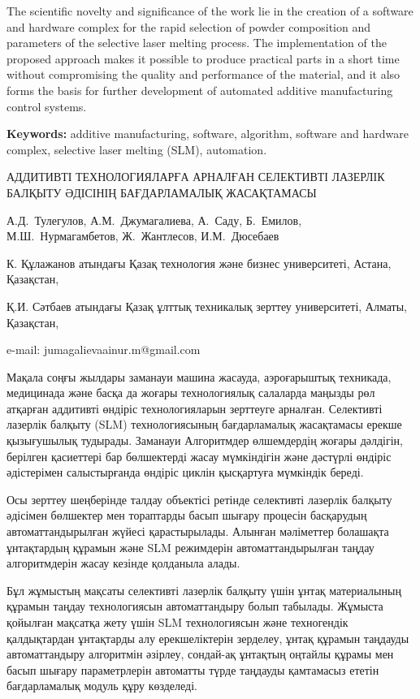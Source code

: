 The scientific novelty and significance of the work lie in the creation
of a software and hardware complex for the rapid selection of powder
composition and parameters of the selective laser melting process. The
implementation of the proposed approach makes it possible to produce
practical parts in a short time without compromising the quality and
performance of the material, and it also forms the basis for further
development of automated additive manufacturing control systems.

{\bfseries Keywords:} additive manufacturing, software, algorithm, software
and hardware complex, selective laser melting (SLM), automation.

\begin{header}
АДДИТИВТІ ТЕХНОЛОГИЯЛАРҒА АРНАЛҒАН СЕЛЕКТИВТІ ЛАЗЕРЛІК БАЛҚЫТУ ӘДІСІНІҢ БАҒДАРЛАМАЛЫҚ ЖАСАҚТАМАСЫ

А.Д.~Тулегулов,
А.М.~Джумагалиева\envelope,
А.~Саду,
Б.~Емилов,
М.Ш.~Нурмагамбетов,
Ж.~Жантлесов,
И.М.~Дюсебаев
\end{header}

\begin{affil}
К. Құлажанов атындағы Қазақ технология және бизнес университеті, Астана, Қазақстан,

Қ.И. Сәтбаев атындағы Қазақ ұлттық техникалық зерттеу университеті, Алматы, Қазақстан,

e-mail: jumagalievaainur.m@gmail.com
\end{affil}

Мақала соңғы жылдары заманауи машина жасауда, аэроғарыштық техникада,
медицинада және басқа да жоғары технологиялық салаларда маңызды рөл
атқарған аддитивті өндіріс технологияларын зерттеуге арналған.
Селективті лазерлік балқыту (SLM) технологиясының бағдарламалық
жасақтамасы ерекше қызығушылық тудырады. Заманауи Алгоритмдер
өлшемдердің жоғары дәлдігін, берілген қасиеттері бар бөлшектерді жасау
мүмкіндігін және дәстүрлі өндіріс әдістерімен салыстырғанда өндіріс
циклін қысқартуға мүмкіндік береді.

Осы зерттеу шеңберінде талдау объектісі ретінде селективті лазерлік
балқыту әдісімен бөлшектер мен тораптарды басып шығару процесін
басқарудың автоматтандырылған жүйесі қарастырылады. Алынған мәліметтер
болашақта ұнтақтардың құрамын және SLM режимдерін автоматтандырылған
таңдау алгоритмдерін жасау кезінде қолданыла алады.

Бұл жұмыстың мақсаты селективті лазерлік балқыту үшін ұнтақ материалының
құрамын таңдау технологиясын автоматтандыру болып табылады. Жұмыста
қойылған мақсатқа жету үшін SLM технологиясын және техногендік
қалдықтардан ұнтақтарды алу ерекшеліктерін зерделеу, ұнтақ құрамын
таңдауды автоматтандыру алгоритмін әзірлеу, сондай-ақ ұнтақтың оңтайлы
құрамы мен басып шығару параметрлерін автоматты түрде таңдауды
қамтамасыз ететін бағдарламалық модуль құру көзделеді.

